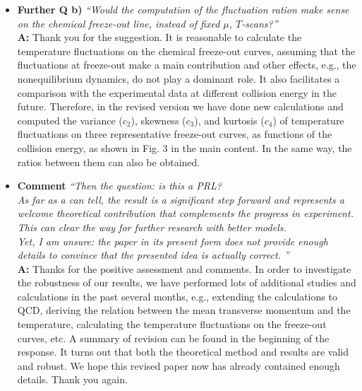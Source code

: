 \documentclass[aps,article,author-year,notitlepage,showpacs]{revtex4-2}
\begin{document}
\begin{itemize}
In order to avoid unnecessary confusion, we would like to follow your suggestion and reduce the highest $\mu_B$ presented in the result plots from 550 MeV to 500 MeV. All the relevant figures have been updated in the revised version. Thanks for the suggestion.\\[1ex]

\item[$\bullet$] {\bf Further Q b)} {\it ``Would the computation of the fluctuation ration make sense on the
chemical freeze-out line, instead of fixed $\mu$, $T$-scans?''}\\[-1ex]

{\bf A:} Thank you for the suggestion. It is reasonable to calculate the temperature fluctuations on the chemical freeze-out curves, assuming that the fluctuations at freeze-out make a main contribution and other effects, e.g., the nonequilibrium dynamics, do not play a dominant role. It also facilitates a comparison with the experimental data at different collision energy in the future. Therefore, in the revised version we have done new calculations and computed the variance ($c_2$), skewness ($c_3$), and kurtosis ($c_4$) of temperature fluctuations on three representative freeze-out curves, as functions of the collision energy, as shown in Fig. 3 in the main content. In the same way, the ratios between them can also be obtained.\\[1ex]

\item[$\bullet$] {\bf Comment} {\it ``Then the question: is this a PRL?\\[-2ex]

As far as a can tell, the result is a significant step forward and
represents a welcome theoretical contribution that complements the
progress in experiment. This can clear the way for further research
with better models.\\[-2ex]

Yet, I am unsure: the paper in its present form does not provide
enough details to convince that the presented idea is actually
correct.
''}\\[-1ex] 

{\bf A:} Thanks for the positive assessment and comments. In order to investigate the robustness of our results, we have performed lots of additional studies and calculations in the past several months, e.g., extending the calculations to QCD, deriving the relation between the mean transverse momentum and the temperature, calculating the temperature fluctuations on the freeze-out curves, etc. A summary of revision can be found in the beginning of the response. It turns out that both the theoretical method and results are valid and robust. We hope this revised paper now has already contained enough details. Thank you again.


\end{itemize}
\end{document}
